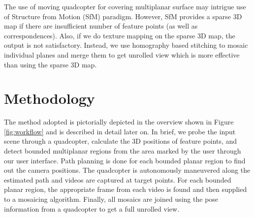 The use of moving quadcopter for covering multiplanar surface may intrigue use
of Structure from Motion (SfM) paradigm. However, SfM provides a sparse 3D map
if there are insufficient number of feature points (as well as correspondences).
Also, if we do texture mapping on the sparse 3D map, the output is not satisfactory.
Instead, we use homography based stitching to mosaic individual planes and merge
them to get unrolled view which is more effective than using the sparse 3D map.




\section{Methodology}
The method adopted is pictorially depicted in the overview shown in Figure
\ref{fig:workflow} and is described in detail later on. In brief, we probe the
input scene through a quadcopter, calculate the 3D positions of feature points,
and detect bounded multiplanar regions from the area marked by the user through
our user interface. Path planning is done for each bounded planar region to find
out the camera positions. The quadcopter is autonomously maneuvered along the
estimated path and videos are captured at target points. For each bounded
planar region, the appropriate frame from each video is found and then supplied
to a mosaicing algorithm.  Finally, all mosaics are joined using the pose information from a quadcopter to get a full unrolled view.


